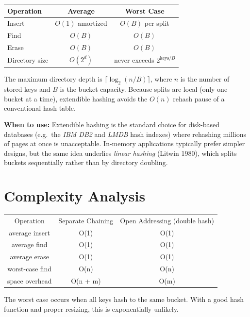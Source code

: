 \begin{center}
\begin{tabular}{lcc}
\toprule
Operation & Average & Worst Case \\
\midrule
Insert & $O(1)$ amortized & $O(B)$ per split \\
Find & $O(B)$ & $O(B)$ \\
Erase & $O(B)$ & $O(B)$ \\
Directory size & $O(2^{d})$ & never exceeds $2^{\text{keys}/B}$ \\
\bottomrule
\end{tabular}
\end{center}

The maximum directory depth is $\lceil \log_{2}(n/B)\rceil $, where $n$ is the number of stored keys and $B$ is the bucket capacity. Because splits are local (only one bucket at a time), extendible hashing avoids the $O(n)$ rehash pause of a conventional hash table.

\textbf{When to use:} Extendible hashing is the standard choice for disk-based databases (e.g.\ the \emph{IBM DB2} and \emph{LMDB} hash indexes) where rehashing millions of pages at once is unacceptable. In-memory applications typically prefer simpler designs, but the same idea underlies \emph{linear hashing} (Litwin 1980), which splits buckets sequentially rather than by directory doubling.

\section{Complexity Analysis}

\begin{center}
\begin{tabular}{ccc}
\toprule
Operation & Separate Chaining & Open Addressing (double hash) \\
average insert & O(1) & O(1) \\
average find & O(1) & O(1) \\
average erase & O(1) & O(1) \\
worst-case find & O(n) & O(n) \\
space overhead & O(n + m) & O(m) \\

\bottomrule
\end{tabular}
\end{center}
The worst case occurs when all keys hash to the same bucket. With a good hash function and proper resizing, this is exponentially unlikely.

